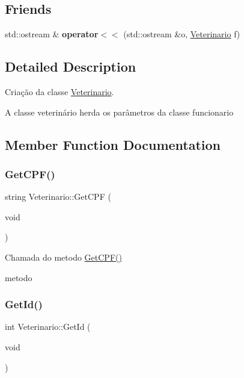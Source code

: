 \subsection*{Friends}
\begin{DoxyCompactItemize}
\item 
\mbox{\label{class_veterinario_a68e7a3c3e66787adf70788bb1e37332d}} 
std\+::ostream \& {\bfseries operator$<$$<$} (std\+::ostream \&o, \mbox{\hyperlink{class_veterinario}{Veterinario}} f)
\end{DoxyCompactItemize}


\subsection{Detailed Description}
Criação da classe \mbox{\hyperlink{class_veterinario}{Veterinario}}. 

A classe veterinário herda os parâmetros da classe funcionario 

\subsection{Member Function Documentation}
\mbox{\label{class_veterinario_aace91dab5527b47f0327dc0f776dfaac}} 
\subsubsection{\texorpdfstring{Get\+C\+P\+F()}{GetCPF()}}
{\footnotesize\ttfamily string Veterinario\+::\+Get\+C\+PF (\begin{DoxyParamCaption}\item[{void}]{ }\end{DoxyParamCaption})}



Chamada do metodo \mbox{\hyperlink{class_veterinario_aace91dab5527b47f0327dc0f776dfaac}{Get\+C\+P\+F()}} 

metodo \mbox{\label{class_veterinario_a05e6b828a11c06782a03a03700e5d3ed}} 
\subsubsection{\texorpdfstring{Get\+Id()}{GetId()}}
{\footnotesize\ttfamily int Veterinario\+::\+Get\+Id (\begin{DoxyParamCaption}\item[{void}]{ }\end{DoxyParamCaption})}



